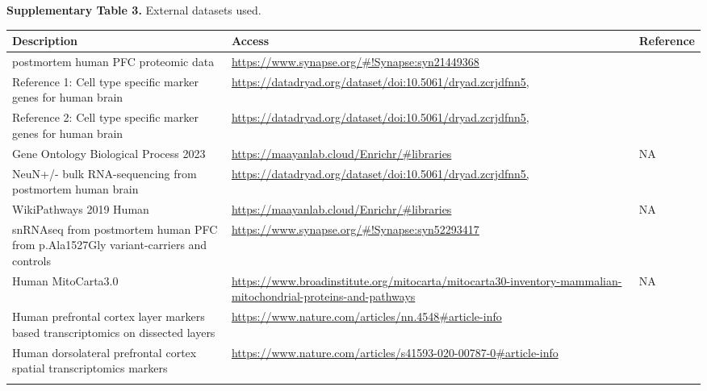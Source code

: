 \clearpage
\textbf{Supplementary Table 3.} External datasets used. 
\begin{longtable}{p{7cm} p{7cm} p{3cm}}
    \hline
    \textbf{Description} & \textbf{Access} & \textbf{Reference} \\ 
    \hline
    \hline
    postmortem human PFC proteomic data & \url{https://www.synapse.org/\#!Synapse:syn21449368} & \supercite{Johnson2020-ib} \\
    \hline
    Reference 1: Cell type specific marker genes for human brain & \url{https://datadryad.org/dataset/doi:10.5061/dryad.zcrjdfnn5,} & \supercite{Wang2018-im} \\
    \hline
    Reference 2: Cell type specific marker genes for human brain & \url{https://datadryad.org/dataset/doi:10.5061/dryad.zcrjdfnn5,} & \supercite{Franzen2019-hh} \\
    \hline
    Gene Ontology Biological Process 2023 & \url{https://maayanlab.cloud/Enrichr/\#libraries} & NA \\
    \hline
    NeuN+/- bulk RNA-sequencing from postmortem human brain & \url{https://datadryad.org/dataset/doi:10.5061/dryad.zcrjdfnn5,} & \supercite{Welch2022-ef} \\
    \hline
    WikiPathways 2019 Human & \url{https://maayanlab.cloud/Enrichr/\#libraries} & NA \\
    \hline
    snRNAseq from postmortem human PFC from p.Ala1527Gly variant-carriers and controls & \url{https://www.synapse.org/\#!Synapse:syn52293417} & \supercite{Mathys2023-rs} \\ 
    \hline
    Human MitoCarta3.0 & \url{https://www.broadinstitute.org/mitocarta/mitocarta30-inventory-mammalian-mitochondrial-proteins-and-pathways} & NA \\
    \hline
    Human prefrontal cortex layer markers based transcriptomics on dissected layers & \url{https://www.nature.com/articles/nn.4548#article-info} & \supercite{He2017-dq} \\
    \hline
    Human dorsolateral prefrontal cortex spatial transcriptomics markers & \url{https://www.nature.com/articles/s41593-020-00787-0#article-info} & \supercite{Maynard2021-mz} \\
    \hline
    \label{tab:external_datasets}
\end{longtable}

